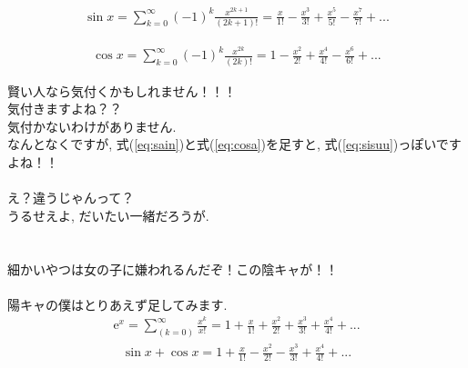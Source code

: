 \documentclass[11pt,a4paper]{jreport}
\begin{document}
\begin{eqnarray}
\sin x = \sum_{k=0}^{\infty}(-1)^k \frac{x^{2k + 1}}{(2k + 1)!} = \frac{x}{1!} - \frac{x^3}{3!} + \frac{x^5}{5!} - \frac{x^7}{7!} +  ...
\label{eq:sain}
\end{eqnarray}

\begin{eqnarray}
\cos x = \sum_{k=0}^\infty(-1)^k \frac{x^{2k}}{(2k)!} = 1 - \frac{x^2}{2!} + \frac{x^4}{4!} - \frac{x^6}{6!} + ...
\label{eq:cosa}
\end{eqnarray}

賢い人なら気付くかもしれません！！！\\
気付きますよね？？\\
気付かないわけがありません.\\
なんとなくですが, 式(\ref{eq:sain})と式(\ref{eq:cosa})を足すと, 式(\ref{eq:sisuu})っぽいですよね！！\\
\\
え？違うじゃんって？\\
うるせえよ, だいたい一緒だろうが.\\
\\
\\
細かいやつは女の子に嫌われるんだぞ！この陰キャが！！\\
\\
陽キャの僕はとりあえず足してみます.
\\
\begin{eqnarray}
\mathrm{e}^x = \sum_{(k=0)}^\infty \frac{x^k}{x!} = 1 + \frac{x}{1!} + \frac{x^2}{2!} + \frac{x^3}{3!} + \frac{x^4}{4!} + ...
\end{eqnarray}
\begin{eqnarray}
\sin x + \cos x = 1 + \frac{x}{1!} - \frac{x^2}{2!} - \frac{x^3}{3!} + \frac{x^4}{4!} + ...
\label{eq:mix}
\end{eqnarray}
\end{document}

